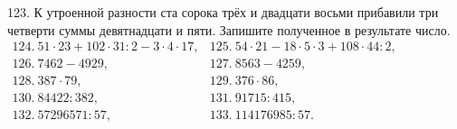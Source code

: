 \documentclass[12pt]{article}
\begin{document}
123. К утроенной разности ста сорока трёх и двадцати восьми прибавили три четверти суммы девятнадцати и пяти. Запишите полученное в результате число.\\
$\begin{array}{lll}
124.\ 51 \cdot 23 + 102 \cdot 31 : 2 - 3 \cdot 4 \cdot 17,& 125.\ 54 \cdot 21 - 18 \cdot 5 \cdot 3 + 108 \cdot 44 : 2,\\
126.\ 7462-4929,& 127.\ 8563-4259,\\
128.\ 387\cdot79,& 129.\ 376\cdot86,\\
130.\ 84422:382,& 131.\ 91715:415,\\
132.\ 57296571 : 57, & 133.\ 114176985 : 57.
\end{array}$
\newpage
\end{document}
